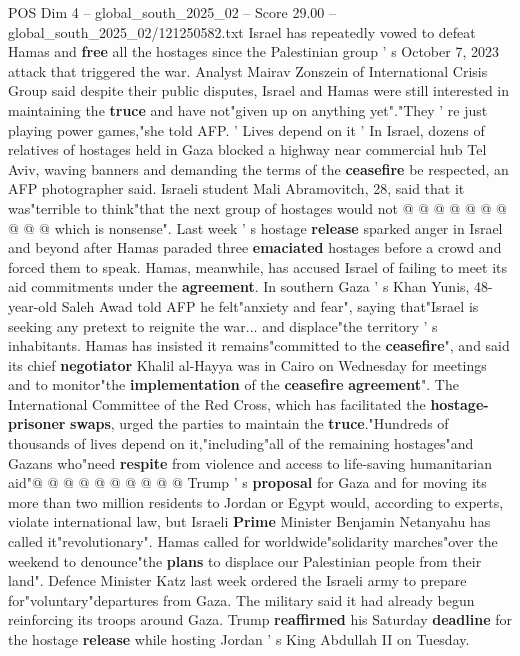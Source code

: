 \begin{textsample}{POS Dim 4 – global\_south\_2025\_02 – Score 29.00 – global\_south\_2025\_02/121250582.txt}
Israel has repeatedly vowed to defeat Hamas and \textbf{free} all the hostages since the Palestinian group ' s October 7, 2023 attack that triggered the war.
Analyst Mairav Zonszein of International Crisis Group said despite their public disputes, Israel and Hamas were still interested in maintaining the \textbf{truce} and have not"given up on anything yet"."They ' re just playing power games,"she told AFP. ' Lives depend on it ' In Israel, dozens of relatives of hostages held in Gaza blocked a highway near commercial hub Tel Aviv, waving banners and demanding the terms of the \textbf{ceasefire} be respected, an AFP photographer said.
Israeli student Mali Abramovitch, 28, said that it was"terrible to think"that the next group of hostages would not @ @ @ @ @ @ @ @ @ @ which is nonsense".
Last week ' s hostage \textbf{release} sparked anger in Israel and beyond after Hamas paraded three \textbf{emaciated} hostages before a crowd and forced them to speak.
Hamas, meanwhile, has accused Israel of failing to meet its aid commitments under the \textbf{agreement}.
In southern Gaza ' s Khan Yunis, 48-year-old Saleh Awad told AFP he felt"anxiety and fear", saying that"Israel is seeking any pretext to reignite the war... and displace"the territory ' s inhabitants.
Hamas has insisted it remains"committed to the \textbf{ceasefire}", and said its chief \textbf{negotiator} Khalil al-Hayya was in Cairo on Wednesday for meetings and to monitor"the \textbf{implementation} of the \textbf{ceasefire} \textbf{agreement}".
The International Committee of the Red Cross, which has facilitated the \textbf{hostage-prisoner} \textbf{swaps}, urged the parties to maintain the \textbf{truce}."Hundreds of thousands of lives depend on it,"including"all of the remaining hostages"and Gazans who"need \textbf{respite} from violence and access to life-saving humanitarian aid"@ @ @ @ @ @ @ @ @ @ Trump ' s \textbf{proposal} for Gaza and for moving its more than two million residents to Jordan or Egypt would, according to experts, violate international law, but Israeli \textbf{Prime} Minister Benjamin Netanyahu has called it"revolutionary".
Hamas called for worldwide"solidarity marches"over the weekend to denounce"the \textbf{plans} to displace our Palestinian people from their land".
Defence Minister Katz last week ordered the Israeli army to prepare for"voluntary"departures from Gaza.
The military said it had already begun reinforcing its troops around Gaza.
Trump \textbf{reaffirmed} his Saturday \textbf{deadline} for the hostage \textbf{release} while hosting Jordan ' s King Abdullah II on Tuesday.

\end{textsample}
